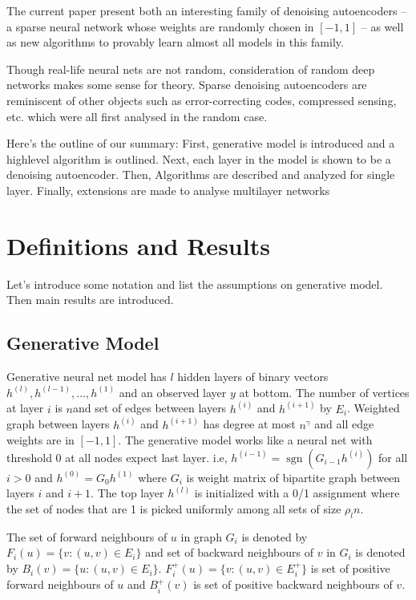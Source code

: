 \documentclass[11pt]{article}
\newcommand{\sgn}{\operatorname{sgn}}
\begin{document}
	The current paper present both an interesting family of denoising autoencoders -- a sparse neural network whose weights are randomly chosen in $[-1,1]$ --  as well as new algorithms to provably learn almost all models in this family. 	
	
	Though real-life neural nets are not random, consideration of random deep networks makes some sense for theory. 
	Sparse denoising autoencoders are reminiscent of other objects such as error-correcting codes, compressed sensing, etc. which were all first analysed in the random case. 
	
	Here's the outline of our summary: First, generative model is introduced and a highlevel algorithm is outlined. 
	Next, each layer in the model is shown to be a denoising autoencoder. Then, Algorithms are described and analyzed for single layer. 
	Finally, extensions are made to analyse multilayer networks
	


	\section{Definitions and Results}
	Let's introduce some notation and list the assumptions on generative model. Then main results are introduced.
	\subsection{Generative Model}
	\label{model}
	Generative neural net model has $l$ hidden layers of binary vectors $h^{(l)},h^{(l-1)},\dots,h^{(1)}$ and an observed layer $y$ at bottom. The number of vertices at layer $i$ is $n$\footnotemark and set of edges between layers $h^{(i)}$ and $h^{(i+1)}$ by $E_i$. Weighted graph between layers  $h^{(i)}$ and $h^{(i+1)}$ has degree at most $n^\gamma$ and all edge weights are in $[-1,1]$. The generative model works like a neural net with threshold 0 at all nodes expect last layer. i.e, $h^{(i-1)} = \sgn(G_{i-1}h^{(i)})$ for all $i>0$ and $h^{(0)} = G_{0}h^{(1)}$ where $G_i$ is weight matrix of bipartite graph between layers $i$ and $i+1$. The top layer  $h^{(l)}$ is initialized with a 0/1 assignment where the set of nodes that are 1 is picked uniformly among all sets of size $\rho_l n$. 
	
	
	The set of forward neighbours of $u$ in graph $G_i$ is denoted by $F_i(u) = \{ v:(u,v)\in E_i\}$ and set of backward neighbours of $v$ in $G_i$ is denoted by $B_i(v) = \{ u:(u,v)\in E_i\}$. $F_i^+(u) = \{ v:(u,v)\in E_i^+\}$ is set of positive forward neighbours of $u$ and $B_i^+(v)$ is set of positive backward neighbours of $v$. 
	
\end{document}
